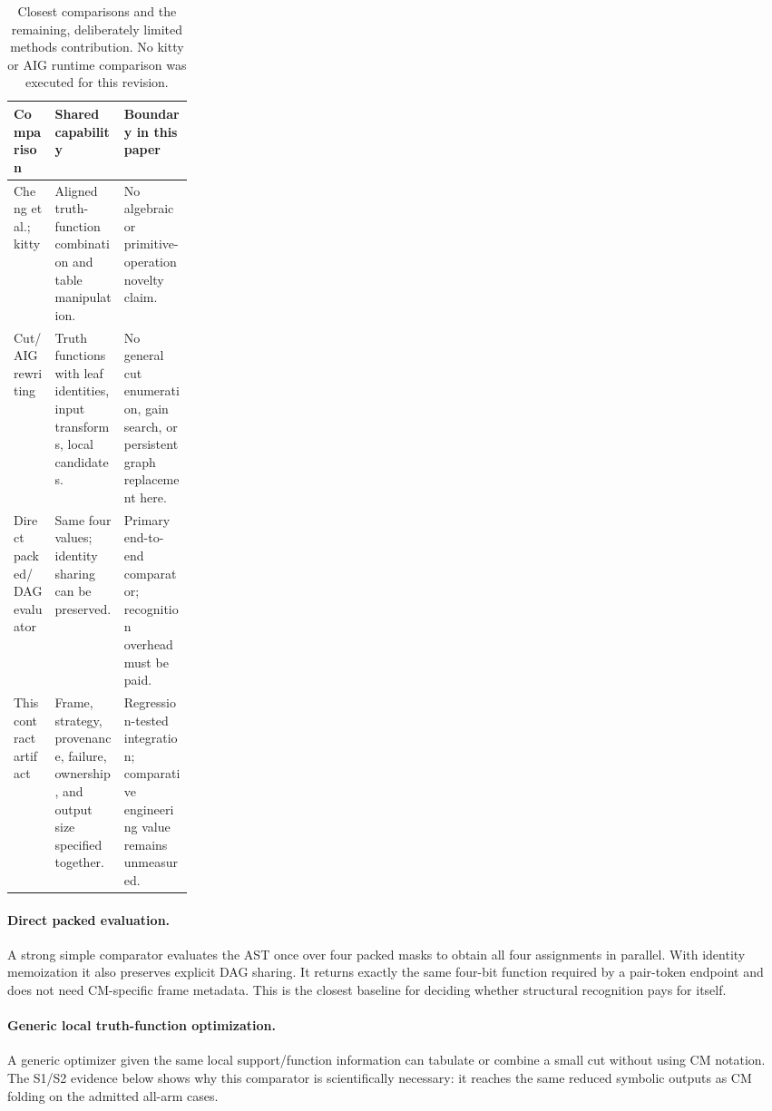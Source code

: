 \documentclass[10pt]{article}
\theoremstyle{plain}
\theoremstyle{definition}
\theoremstyle{remark}
\begin{document}
\begin{table}[H]
\small\centering
\begin{tabularx}{\linewidth}{@{}p{0.23\linewidth}XX@{}}
\toprule
\textbf{Comparison} & \textbf{Shared capability} & \textbf{Boundary in this paper}\\
\midrule
Cheng et al.; kitty & Aligned truth-function combination and table manipulation. & No algebraic or primitive-operation novelty claim.\\
Cut/AIG rewriting & Truth functions with leaf identities, input transforms, local candidates. & No general cut enumeration, gain search, or persistent graph replacement here.\\
Direct packed/DAG evaluator & Same four values; identity sharing can be preserved. & Primary end-to-end comparator; recognition overhead must be paid.\\
This contract artifact & Frame, strategy, provenance, failure, ownership, and output size specified together. & Regression-tested integration; comparative engineering value remains unmeasured.\\
\bottomrule
\end{tabularx}
\caption{Closest comparisons and the remaining, deliberately limited methods contribution. No kitty or AIG runtime comparison was executed for this revision.}
\end{table}

\paragraph{Direct packed evaluation.}
A strong simple comparator evaluates the AST once over four packed masks to obtain all four assignments in parallel. With identity memoization it also preserves explicit DAG sharing. It returns exactly the same four-bit function required by a pair-token endpoint and does not need CM-specific frame metadata. This is the closest baseline for deciding whether structural recognition pays for itself.

\paragraph{Generic local truth-function optimization.}
A generic optimizer given the same local support/function information can tabulate or combine a small cut without using CM notation. The S1/S2 evidence below shows why this comparator is scientifically necessary: it reaches the same reduced symbolic outputs as CM folding on the admitted all-arm cases.
\end{document}
